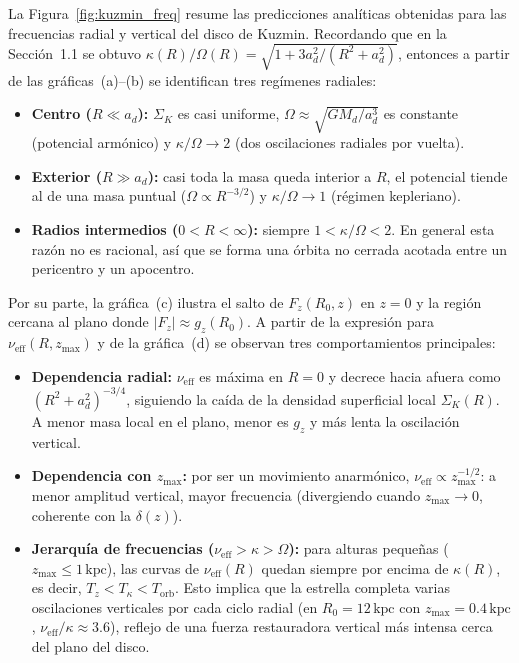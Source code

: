 \documentclass[11pt,letterpaper]{article}
\begin{document}
La Figura~\ref{fig:kuzmin_freq} resume las predicciones analíticas obtenidas para las frecuencias radial y vertical del disco de Kuzmin. Recordando que en la Sección~1.1 se obtuvo $\kappa(R)/\Omega(R) = \sqrt{1 + 3a_d^2/(R^2 + a_d^2)}$, entonces a partir de las gráficas~(a)--(b) se identifican tres regímenes radiales:
\begin{itemize}
    \item \textbf{Centro ($R \ll a_d$):} $\Sigma_K$ es casi uniforme, $\Omega \approx \sqrt{GM_d/a_d^3}$ es constante (potencial armónico) y $\kappa/\Omega \to 2$ (dos oscilaciones radiales por vuelta).
    \item \textbf{Exterior ($R \gg a_d$):} casi toda la masa queda interior a $R$, el potencial tiende al de una masa puntual ($\Omega \propto R^{-3/2}$) y $\kappa/\Omega \to 1$ (régimen kepleriano).
    \item \textbf{Radios intermedios ($0 < R < \infty$):} siempre $1 < \kappa/\Omega < 2$. En general esta razón no es racional, así que se forma una órbita no cerrada acotada entre un pericentro y un apocentro.
\end{itemize}

Por su parte, la gráfica~(c) ilustra el salto de $F_z(R_0, z)$ en $z = 0$ y la región cercana al plano donde $|F_z| \approx g_z(R_0)$. A partir de la expresión para $\nu_{\mathrm{eff}}(R, z_{\max})$ y de la gráfica~(d) se observan tres comportamientos principales:
\begin{itemize}
    \item \textbf{Dependencia radial:} $\nu_{\mathrm{eff}}$ es máxima en $R = 0$ y decrece hacia afuera como $(R^2 + a_d^2)^{-3/4}$, siguiendo la caída de la densidad superficial local $\Sigma_K(R)$. A menor masa local en el plano, menor es $g_z$ y más lenta la oscilación vertical.
    \item \textbf{Dependencia con $z_{\max}$:} por ser un movimiento anarmónico, $\nu_{\mathrm{eff}} \propto z_{\max}^{-1/2}$: a menor amplitud vertical, mayor frecuencia (divergiendo cuando $z_{\max} \to 0$, coherente con la $\delta(z)$).
    \item \textbf{Jerarquía de frecuencias ($\nu_{\mathrm{eff}} > \kappa > \Omega$):} para alturas pequeñas ($z_{\max} \le 1\,\mathrm{kpc}$), las curvas de $\nu_{\mathrm{eff}}(R)$ quedan siempre por encima de $\kappa(R)$, es decir, $T_z < T_\kappa < T_{\mathrm{orb}}$. Esto implica que la estrella completa varias oscilaciones verticales por cada ciclo radial (en $R_0 = 12\,\mathrm{kpc}$ con $z_{\max} = 0.4\,\mathrm{kpc}$, $\nu_{\mathrm{eff}}/\kappa \approx 3.6$), reflejo de una fuerza restauradora vertical más intensa cerca del plano del disco.
\end{itemize}
\end{document}

